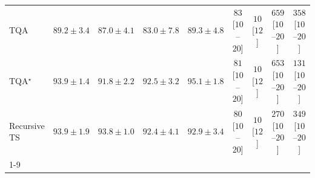 \begin{tabular}{l|cccc|cccc|}
TQA & {\cellcolor[HTML]{4A98C5}} \color[HTML]{F1F1F1} $89.2\pm 3.4$ & {\cellcolor[HTML]{80AED2}} \color[HTML]{F1F1F1} $87.0\pm 4.1$ & {\cellcolor[HTML]{C9CEE4}} \color[HTML]{000000} $83.0\pm 7.8$ & {\cellcolor[HTML]{4897C4}} \color[HTML]{F1F1F1} $89.3\pm 4.8$ & {\cellcolor[HTML]{FDE4E0}} \color[HTML]{000000} $83$ [$10$--$20$] & {\cellcolor[HTML]{FFF7F3}} \color[HTML]{000000} $10$ [$12$] & {\cellcolor[HTML]{58006E}} \color[HTML]{F1F1F1} $659$ [$10$--$20$] & {\cellcolor[HTML]{F462A0}} \color[HTML]{F1F1F1} $358$ [$10$--$20$] \\
TQA$^\star$ & {\cellcolor[HTML]{04649D}} \color[HTML]{F1F1F1} $93.9\pm 1.4$ & {\cellcolor[HTML]{1379B5}} \color[HTML]{F1F1F1} $91.8\pm 2.2$ & {\cellcolor[HTML]{0570B0}} \color[HTML]{F1F1F1} $92.5\pm 3.2$ & {\cellcolor[HTML]{04588A}} \color[HTML]{F1F1F1} $95.1\pm 1.8$ & {\cellcolor[HTML]{FDE4E1}} \color[HTML]{000000} $81$ [$10$--$20$] & {\cellcolor[HTML]{FFF7F3}} \color[HTML]{000000} $10$ [$12$] & {\cellcolor[HTML]{5D006F}} \color[HTML]{F1F1F1} $653$ [$10$--$20$] & {\cellcolor[HTML]{FDD5D1}} \color[HTML]{000000} $131$ [$10$--$20$] \\
Recursive TS & {\cellcolor[HTML]{04649D}} \color[HTML]{F1F1F1} $93.9\pm 1.9$ & {\cellcolor[HTML]{04649E}} \color[HTML]{F1F1F1} $93.8\pm 1.0$ & {\cellcolor[HTML]{0771B1}} \color[HTML]{F1F1F1} $92.4\pm 4.1$ & {\cellcolor[HTML]{056DAB}} \color[HTML]{F1F1F1} $92.9\pm 3.4$ & {\cellcolor[HTML]{FDE4E1}} \color[HTML]{000000} $80$ [$10$--$20$] & {\cellcolor[HTML]{FFF7F3}} \color[HTML]{000000} $10$ [$12$] & {\cellcolor[HTML]{FA9BB4}} \color[HTML]{000000} $270$ [$10$--$20$] & {\cellcolor[HTML]{F767A1}} \color[HTML]{F1F1F1} $349$ [$10$--$20$] \\
\cline{1-9}
\bottomrule
\end{tabular}
